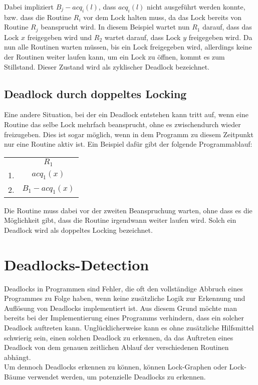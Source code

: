 Dabei impliziert $B_j-acq_i(l)$, dass $acq_{i}(l)$ nicht ausgeführt werden konnte,
bzw. dass die Routine $R_i$ vor dem Lock halten muss, da das Lock bereits von 
Routine $R_j$ beansprucht wird. In diesem Beispiel wartet nun $R_1$ 
darauf, dass das Lock $x$ freigegeben wird und $R_2$ wartet darauf, dass Lock 
$y$ freigegeben wird. Da nun alle Routinen warten müssen, bis ein Lock freigegeben 
wird, allerdings keine der Routinen weiter laufen kann, um ein Lock zu öffnen, 
kommt es zum Stillstand. Dieser Zustand wird als zyklischer Deadlock bezeichnet.
\subsection{Deadlock durch doppeltes Locking}\label{Kap::Theo:DoubleLocking}
Eine andere Situation, bei der ein Deadlock entstehen kann tritt auf, wenn 
eine Routine das selbe Lock mehrfach beansprucht, ohne es zwischendurch wieder 
freizugeben. Dies ist sogar möglich, wenn in dem Programm zu diesem Zeitpunkt
nur eine Routine aktiv ist. Ein Beispiel dafür gibt der folgende Programmablauf:
\begin{table}[H]
    \centering
    \begin{tabular}{cc}
        & $R_1$ \\
        1. & $acq_{1}(x)$ \\
        2. & $B_1-acq_1(x)$
    \end{tabular}
\end{table}
Die Routine muss dabei vor der zweiten Beanspruchung warten,
ohne dass es die Möglichkeit gibt, dass die Routine irgendwann weiter laufen wird.
Solch ein Deadlock wird als doppeltes Locking bezeichnet.\\
\section{Deadlocks-Detection}
Deadlocks in Programmen sind Fehler, die oft den vollständige Abbruch eines 
Programmes zu Folge haben, wenn keine zusätzliche Logik zur Erkennung und Auflösung von 
Deadlocks implementiert ist. Aus diesem Grund möchte man bereits bei der 
Implementierung eines Programms verhindern, dass ein solcher Deadlock auftreten 
kann. Unglücklicherweise kann es ohne zusätzliche Hilfsmittel schwierig sein, 
einen solchen Deadlock zu erkennen, da das Auftreten eines Deadlock von dem 
genauen zeitlichen Ablauf der verschiedenen Routinen abhängt.\\
Um dennoch Deadlocks 
erkennen zu können, können Lock-Graphen oder Lock-Bäume verwendet werden, um 
potenzielle Deadlocks zu erkennen. 
